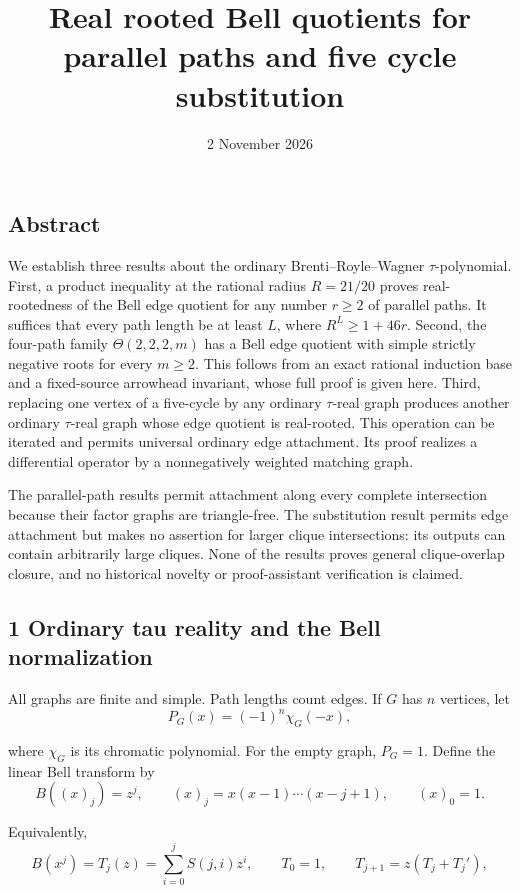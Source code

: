 \documentclass[
  11pt,
  a4paper,
]{article}
\title{Real rooted Bell quotients for parallel paths and five cycle
substitution}
\author{}
\date{2 November 2026}
\makeatletter
\renewcommand{\maketitle}{%
  \begin{center}
    {\LARGE\@title\par}
    \vspace{0.8em}
    {\normalsize\@date\par}
  \end{center}
  \vspace{0.8em}
}
\makeatother
\begin{document}
\maketitle

\subsection{Abstract}\label{abstract}

We establish three results about the ordinary Brenti--Royle--Wagner
\(\tau\)-polynomial. First, a product inequality at the rational radius
\(R=21/20\) proves real-rootedness of the Bell edge quotient for any
number \(r\geq2\) of parallel paths. It suffices that every path length
be at least \(L\), where \(R^L\geq1+46r\). Second, the four-path family
\(\Theta(2,2,2,m)\) has a Bell edge quotient with simple strictly
negative roots for every \(m\geq2\). This follows from an exact rational
induction base and a fixed-source arrowhead invariant, whose full proof
is given here. Third, replacing one vertex of a five-cycle by any
ordinary \(\tau\)-real graph produces another ordinary \(\tau\)-real
graph whose edge quotient is real-rooted. This operation can be iterated
and permits universal ordinary edge attachment. Its proof realizes a
differential operator by a nonnegatively weighted matching graph.

The parallel-path results permit attachment along every complete
intersection because their factor graphs are triangle-free. The
substitution result permits edge attachment but makes no assertion for
larger clique intersections: its outputs can contain arbitrarily large
cliques. None of the results proves general clique-overlap closure, and
no historical novelty or proof-assistant verification is claimed.

\subsection{1 Ordinary tau reality and the Bell
normalization}\label{ordinary-tau-reality-and-the-bell-normalization}

All graphs are finite and simple. Path lengths count edges. If \(G\) has
\(n\) vertices, let
\nopagebreak
\[
P_G(x)=(-1)^n\chi_G(-x),
\]

where \(\chi_G\) is its chromatic polynomial. For the empty graph,
\(P_G=1\). Define the linear Bell transform by
\nopagebreak
\[
B((x)_j)=z^j,\qquad
(x)_j=x(x-1)\cdots(x-j+1),\qquad (x)_0=1.
\]

Equivalently,
\nopagebreak
\[
B(x^j)=T_j(z)=\sum_{i=0}^j S(j,i)z^i,
\qquad T_0=1,\qquad T_{j+1}=z(T_j+T_j'),
\]
\end{document}

